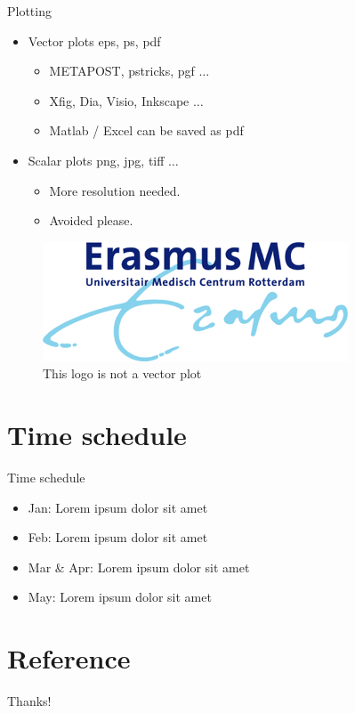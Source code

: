 \documentclass{beamer}
\begin{document}
\begin{frame}{Plotting}
    \begin{itemize}
        \item Vector plots eps, ps, pdf
        \begin{itemize}
            \item METAPOST, pstricks, pgf $\ldots$
            \item Xfig, Dia, Visio, Inkscape $\ldots$
            \item Matlab / Excel can be saved as pdf
        \end{itemize}
        \item Scalar plots png, jpg, tiff $\ldots$
        \begin{itemize}
            \item More resolution needed.
            \item Avoided please.
        \end{itemize}
    \end{itemize}
    \begin{figure}[htpb]
        \centering
        \includegraphics[width=0.2\linewidth]{pic/erasmusmc_logo.png}
        \caption{This logo is not a vector plot}
    \end{figure}
\end{frame}

\section{Time schedule}
\begin{frame}{Time schedule}
    \begin{itemize}
        \item Jan: Lorem ipsum dolor sit amet
        \item Feb: Lorem ipsum dolor sit amet
        \item Mar \& Apr: Lorem ipsum dolor sit amet
        \item May: Lorem ipsum dolor sit amet
    \end{itemize}
\end{frame}

\section{Reference}

\begin{frame}[allowframebreaks]
    \printbibliography
\end{frame}

\begin{frame}
    \begin{center}
        {\Huge\calligra Thanks!}
    \end{center}
\end{frame}
\end{document}
